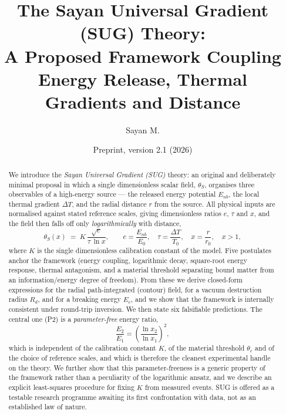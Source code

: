 \documentclass[11pt,a4paper]{article}
\title{\bfseries The Sayan Universal Gradient (SUG) Theory:\\
       A Proposed Framework Coupling Energy Release, Thermal Gradients
       and Distance}
\author{Sayan M.}
\date{Preprint, version 2.1 (2026)}
\newcommand{\thetaS}{\theta_{S}}
\newcommand{\tgrad}{\tau}
\begin{document}
\maketitle

\begin{abstract}
We introduce the \emph{Sayan Universal Gradient (SUG)} theory: an original
and deliberately minimal proposal in which a single dimensionless scalar
field, $\thetaS$, organises three observables of a high-energy source --- the
released energy potential $E_{nb}$, the local thermal gradient $\Delta T$, and
the radial distance $r$ from the source. All physical inputs are normalised
against stated reference scales, giving dimensionless ratios $e$, $\tgrad$ and $x$,
and the field then falls off only \emph{logarithmically} with distance,
\begin{equation}
  \thetaS(x) \;=\; K\,\frac{\sqrt{e}}{\tgrad\,\ln x},
  \qquad
  e=\frac{E_{nb}}{E_0},\quad \tgrad=\frac{\Delta T}{T_0},\quad
  x=\frac{r}{r_0},\quad x>1 ,
\end{equation}
where $K$ is the single dimensionless calibration constant of the model. Five
postulates anchor the framework (energy coupling, logarithmic decay,
square-root energy response, thermal antagonism, and a material threshold
separating bound matter from an information/energy degree of freedom). From
these we derive closed-form expressions for the radial path-integrated
(contour) field, for a vacuum destruction radius $R_d$, and for a breaking
energy $E_c$, and we show that the framework is internally consistent under
round-trip inversion. We then state six falsifiable predictions. The central
one (P2) is a \emph{parameter-free} energy ratio,
\begin{equation}
  \frac{E_2}{E_1} = \left(\frac{\ln x_2}{\ln x_1}\right)^{\!2},
\end{equation}
which is independent of the calibration constant $K$, of the material
threshold $\theta_c$ and of the choice of reference scales, and which is
therefore the cleanest experimental handle on the theory. We further show
that this parameter-freeness is a generic property of the framework rather
than a peculiarity of the logarithmic ansatz, and we describe an explicit
least-squares procedure for fixing $K$ from measured events. SUG is offered
as a testable research programme awaiting its first confrontation with data,
not as an established law of nature.
\end{abstract}

\end{document}
